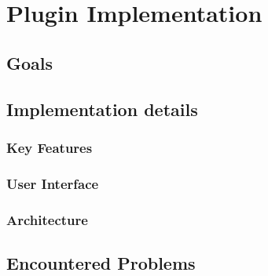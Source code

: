 %

\chapter{Plugin Implementation}
\label{chap:PluginImplementation}

\blindtext[1]

\section{Goals}
\label{sec:goals}

\blindtext[2]

\section{Implementation details}
\label{sec:implementationDetails}

\blindtext[1]


\subsection{Key Features}
\label{sec:keyFeatures}

\blindtext[2]

\subsection{User Interface}
\label{sec:userInterface}

\blindtext[8]

\subsection{Architecture}
\label{sec:Architecture}

\blindtext[8]


\section{Encountered Problems}
\label{sec:encounteredProblems}

